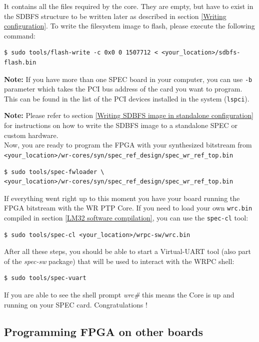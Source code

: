 \documentclass[a4paper, 12pt]{article}
\newcommand{\code}[1]{\texttt{#1}}
\begin{document}
It contains all the files required by the core. They are empty, but have to
exist in the SDBFS structure to be written later as described in section
\ref{Writing configuration}. To write the filesystem image to flash, please
execute the following command:
\begin{lstlisting}
$ sudo tools/flash-write -c 0x0 0 1507712 < <your_location>/sdbfs-flash.bin
\end{lstlisting}

\noindent\textbf{Note:} If you have more than one SPEC board in your computer,
you can use \code{-b} parameter which takes the PCI bus address of the card you
want to program. This can be found in the list of the PCI devices installed in
the system (\code{lspci}).

\noindent\textbf{Note:} Please refer to section \ref{Writing SDBFS image in
standalone configuration} for instructions on how to write the SDBFS image to a
standalone SPEC or custom hardware.\\

Now, you are ready to program the FPGA with your synthesized bitstream from
\texttt{<your\_location>/wr-cores/syn/spec\_ref\_design/spec\_wr\_ref\_top.bin}
\begin{lstlisting}
$ sudo tools/spec-fwloader \
<your_location>/wr-cores/syn/spec_ref_design/spec_wr_ref_top.bin
\end{lstlisting}

If everything went right up to this moment you have your board running the FPGA 
bitstream with the WR PTP Core. If you need to load your own \texttt{wrc.bin}
compiled in section \ref{LM32 software compilation}, you can use the
\texttt{spec-cl} tool:
\begin{lstlisting}
$ sudo tools/spec-cl <your_location>/wrpc-sw/wrc.bin
\end{lstlisting}

After all these steps, you should be able to start a Virtual-UART tool (also
part of the \textit{spec-sw} package) that will be used to interact with the
WRPC shell:
\begin{lstlisting}
$ sudo tools/spec-vuart
\end{lstlisting}

If you are able to see the shell prompt \textit{wrc\#} this means the Core
is up and running on your SPEC card. Congratulations !

\subsection{Programming FPGA on other boards}
\end{document}
